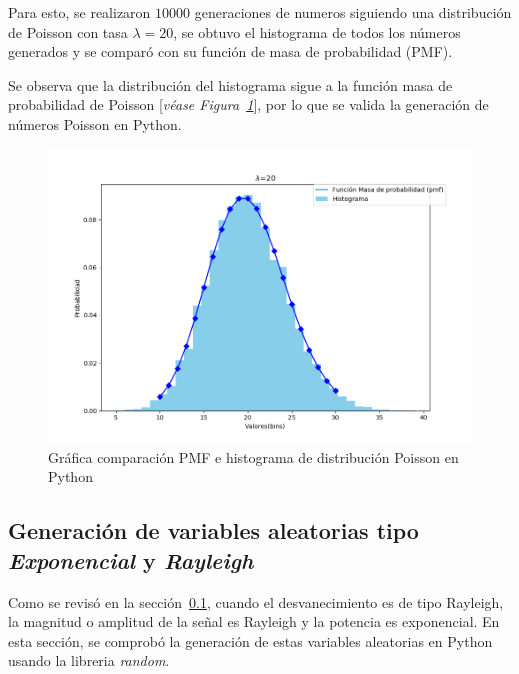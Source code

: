 Para esto, se realizaron $10000$ generaciones de numeros siguiendo una distribución de Poisson con tasa $\lambda = 20$, se obtuvo el histograma de todos los números generados y se comparó con su función de masa de probabilidad (PMF).\newline

Se observa que la distribución del histograma sigue a la función masa de probabilidad de Poisson [\textit{véase Figura~\ref{fig:generacionPoisson}}], por lo que se valida la generación de números Poisson en Python.\newline

\begin{figure}[th]
    \centering
    \includegraphics[scale=.5]{Figures/PoissonDistribution}
    \decoRule
    \caption[Gráfica comparación PMF e histograma de distribución Poisson en Python]{Gráfica comparación PMF e histograma de distribución Poisson en Python}
    \label{fig:generacionPoisson}
\end{figure}
\break

\subsection{Generación de variables aleatorias tipo \textit{Exponencial} y \textit{Rayleigh}}

Como se revisó en la sección~\ref{}, cuando el desvanecimiento es de tipo Rayleigh, la magnitud o amplitud de la señal es Rayleigh y la potencia es exponencial. En esta sección, se comprobó la generación de estas variables aleatorias en Python usando la libreria \textit{random}.\newline

